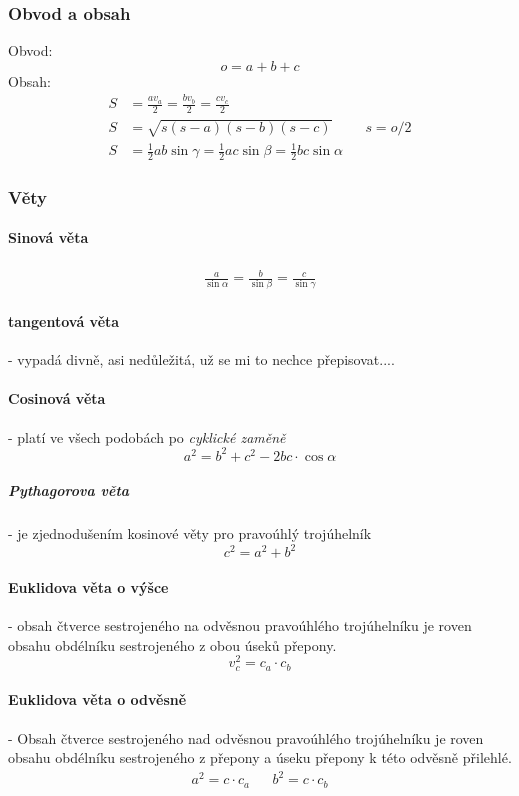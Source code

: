 \documentclass[12pt]{article}
\begin{document}
\subsubsection{Obvod a obsah}
Obvod:
\begin{equation}
o = a +b+c
\end{equation}
Obsah:
\begin{align}
S &= \frac{av_a}{2} = \frac{bv_b}{2} = \frac{cv_c}{2}\\
S &= \sqrt{s(s-a)(s-b)(s-c)} && s =o/2\\
S &= \frac{1}{2}ab\sin\gamma = \frac{1}{2}ac\sin\beta = \frac{1}{2}bc\sin\alpha
\end{align}
\subsubsection{Věty}
\label{sec:troj-vety}
\paragraph{Sinová věta}
\begin{align}
\frac{a}{\sin\alpha} =\frac{b}{\sin\beta} = \frac{c}{\sin\gamma}
\end{align}
\paragraph{tangentová věta} - vypadá divně, asi nedůležitá, už se mi to nechce přepisovat....
\paragraph{Cosinová věta} - platí ve všech podobách po \emph{cyklické zaměně}
\begin{equation}
a^2 = b^2 + c^2 - 2bc \cdot \cos \alpha
\end{equation}
\subparagraph{Pythagorova věta} - je zjednodušením kosinové věty pro pravoúhlý trojúhelník
\begin{equation}
c^2 = a^2 + b^2
\end{equation}
\paragraph{Euklidova věta o výšce} - obsah čtverce sestrojeného na odvěsnou pravoúhlého trojúhelníku je roven obsahu obdélníku sestrojeného z obou úseků přepony.
\begin{equation}
v_c^2 = c_a \cdot c_b
\end{equation}
\paragraph{Euklidova věta o odvěsně} - Obsah čtverce sestrojeného nad odvěsnou pravoúhlého trojúhelníku je roven obsahu obdélníku sestrojeného z přepony a úseku přepony k této odvěsně přilehlé.
\begin{align}
a^2 = c \cdot c_a && b^2 = c \cdot c_b
\end{align}
\end{document}
